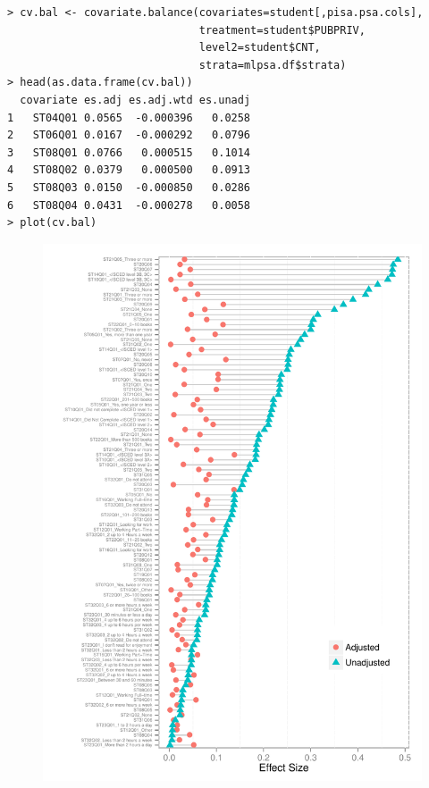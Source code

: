 \documentclass[letterpaper,12p,twoside]{article} %
\begin{document}
\begin{verbatim}
> cv.bal <- covariate.balance(covariates=student[,pisa.psa.cols],
                              treatment=student$PUBPRIV,
                              level2=student$CNT,
                              strata=mlpsa.df$strata)
> head(as.data.frame(cv.bal))
  covariate es.adj es.adj.wtd es.unadj
1   ST04Q01 0.0565  -0.000396   0.0258
2   ST06Q01 0.0167  -0.000292   0.0796
3   ST08Q01 0.0766   0.000515   0.1014
4   ST08Q02 0.0379   0.000500   0.0913
5   ST08Q03 0.0150  -0.000850   0.0286
6   ST08Q04 0.0431  -0.000278   0.0058
> plot(cv.bal)
\end{verbatim}

\begin{figure}[h!]
\begin{center}
\includegraphics[width=\textwidth]{../Figures/pisabalance.pdf}
\end{center}
\end{figure}
\end{document}
